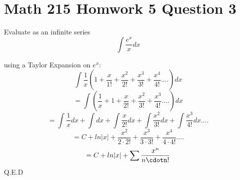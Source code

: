\documentclass{article}
\begin{document}
\section{Math 215 Homwork 5 Question 3}

Evaluate as an infinite series
\begin{equation}
    \int{\frac{e^x}{x} dx}
\end{equation}

using a Taylor Expansion on $e^x$:
\begin{equation}
    \int{\frac{1}{x}(1+\frac{x}{1!}+\frac{x^2}{2!}+\frac{x^3}{3!}+\frac{x^4}{4!} .... )dx}
\end{equation}
\begin{equation}
    = \int{(\frac{1}{x}+1+\frac{x}{2!}+\frac{x^2}{3!}+\frac{x^3}{4!} .... )dx}
\end{equation}
\begin{equation}
    = \int\frac{1}{x}dx+\int dx+\int\frac{x}{2!}dx+\int\frac{x^2}{3!}dx+\int\frac{x^3}{4!}dx ....
\end{equation}
\begin{equation}
    = C + ln|x| + \frac{x^2}{2\cdot2!}+\frac{x^3}{3\cdot3!}+\frac{x^4}{4\cdot4!} ....
\end{equation}
\begin{equation}
    = C + ln|x| + \sum\frac{x^n}{n\cdotn!}
\end{equation}
Q.E.D
\end{document}
